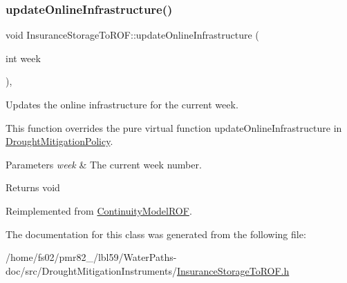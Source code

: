 \subsubsection{\texorpdfstring{update\+Online\+Infrastructure()}{updateOnlineInfrastructure()}}
{\footnotesize\ttfamily void Insurance\+Storage\+To\+R\+O\+F\+::update\+Online\+Infrastructure (\begin{DoxyParamCaption}\item[{int}]{week }\end{DoxyParamCaption})\hspace{0.3cm}{\ttfamily [override]}, {\ttfamily [virtual]}}



Updates the online infrastructure for the current week. 

This function overrides the pure virtual function update\+Online\+Infrastructure in \mbox{\hyperlink{classDroughtMitigationPolicy}{Drought\+Mitigation\+Policy}}.


\begin{DoxyParams}{Parameters}
{\em week} & The current week number.\\
\hline
\end{DoxyParams}
\begin{DoxyReturn}{Returns}
void 
\end{DoxyReturn}


Reimplemented from \mbox{\hyperlink{classContinuityModelROF_a06cf47a32d6793b0ee912deccf92fc5b}{Continuity\+Model\+R\+OF}}.



The documentation for this class was generated from the following file\+:\begin{DoxyCompactItemize}
\item 
/home/fs02/pmr82\+\_/lbl59/\+Water\+Paths-\/doc/src/\+Drought\+Mitigation\+Instruments/\mbox{\hyperlink{InsuranceStorageToROF_8h}{Insurance\+Storage\+To\+R\+O\+F.\+h}}\end{DoxyCompactItemize}
